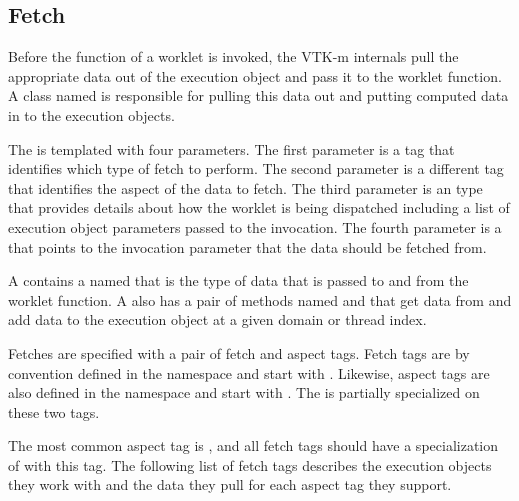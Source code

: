 

\subsection{Fetch}
\label{sec:Fetch}


Before the function of a worklet is invoked, the VTK-m internals pull the
appropriate data out of the execution object and pass it to the worklet
function. A class named  is responsible for pulling this
data out and putting computed data in to the execution objects.

The   is templated with four
parameters. The first parameter is a tag that identifies which type of
fetch to perform. The second parameter is a different tag that identifies
the aspect of the data to fetch. The third parameter is an
 type that provides details about how the
worklet is being dispatched including a list of execution object parameters
passed to the invocation. The fourth parameter is a  that
points to the invocation parameter that the data should be fetched from.

A  contains a  named
 that is the type of data that is passed to and from
the worklet function. A  also has a pair of methods
named  and  that get data from and add data
to the execution object at a given domain or thread index.


Fetches are specified with a pair of fetch and aspect tags. Fetch tags are by
convention defined in the \vtkmexecarg{} namespace and start with
. Likewise, aspect tags are also defined in the
\vtkmexecarg{} namespace and start with . The
  is partially specialized on these
two tags.

 The most common aspect tag is
, and all fetch tags should have a
specialization of  with this tag. The following list of
fetch tags describes the execution objects they work with and the data they
pull for each aspect tag they support.

